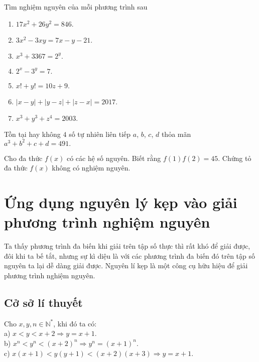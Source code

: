 \begin{bt}%
	Tìm nghiệm nguyên của mỗi phương trình sau
\end{bt}
\begin{enumerate}
	\item $17x^2+26y^2=846.$
	\item $3x^2-3xy=7x-y-21.$
	\item $x^3+3367=2^y.$
	\item $2^x-3^y=7.$
	\item $x!+y!=10z+9.$
	\item $|x-y|+|y-z|+|z-x|=2017.$
	\item $x^3+y^3+z^4=2003.$
\end{enumerate}

\begin{bt}%
	Tồn tại hay không $4$ số tự nhiên liên tiếp $a$, $b$, $c$, $d$ thỏa mãn $a^3+b^2+c+d=491.$
\end{bt}


\begin{bt}%
	Cho đa thức $f(x)$ có các hệ số nguyên. Biết rằng $f(1)f(2)=45.$ Chứng tỏ đa thức $f(x)$ không có nghiệm nguyên.
\end{bt}




\section{Ứng dụng nguyên lý kẹp vào giải phương trình nghiệm nguyên}
\begin{center}
	\textbf{\color{violet}{Hoàng Thuật\\
			(GV THCS Nguyễn Trực, Thanh Oai, Hà Nội)}}
\end{center}
Ta thấy phương trình đa biến khi giải trên tập số thực thì rất khó để giải được, đôi khi ta bế tắt, nhưng sự kì diệu là với các phương trình đa biến đó trên tập số nguyên ta lại dễ dàng giải được. Nguyên lí kẹp là một công cụ hữu hiệu để giải phương trình nghiệm nguyên.
\subsection{Cở sở lí thuyết}
Cho $x, y, n \in \mathbb{N}^*$, khi đó ta có:\\
a) $x<y<x+2 \Rightarrow y=x+1$.\\
b) $x^n<y^n<(x+2)^n \Rightarrow y^n=(x+1)^n$.\\
c) $x(x+1)<y(y+1)<(x+2)(x+3) \Rightarrow y=x+1$.
